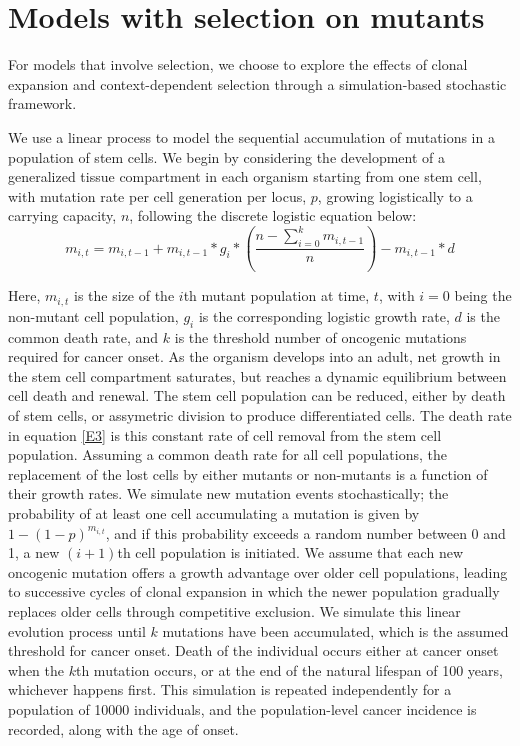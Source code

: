 \documentclass[10pt,twocolumn,twoside]{article}
\begin{document}
\section{Models with selection on mutants}
For models that involve selection, we choose to explore the effects of clonal expansion and context-dependent selection through a simulation-based stochastic framework. 

We use a linear process to model the sequential accumulation of mutations in a population of stem cells. We begin by considering the development of a generalized tissue compartment in each organism starting from one stem cell, with mutation rate per cell generation per locus, $p$, growing logistically to a carrying capacity, $n$, following the discrete logistic equation below:
\begin{equation}
	m_{i, t} = m_{i, t-1} + m_{i, t-1}*g_{i}*(\dfrac{n-\sum_{i=0}^{k} m_{i, t-1}}{n}) - m_{i, t-1}*d
	\label{E3}	
\end{equation}

Here, $m_{i, t}$ is the size of the $i$th mutant population at time, $t$, with $i=0$ being the non-mutant cell population, $g_{i}$ is the corresponding logistic growth rate, $d$ is the common death rate, and $k$ is the threshold number of oncogenic mutations required for cancer onset. As the organism develops into an adult, net growth in the stem cell compartment saturates, but reaches a dynamic equilibrium between cell death and renewal. The stem cell population can be reduced, either by death of stem cells, or assymetric division to produce differentiated cells. The death rate in equation \ref{E3} is this constant rate of cell removal from the stem cell population. Assuming a common death rate for all cell populations, the replacement of the lost cells by either mutants or non-mutants is a function of their growth rates. We simulate new mutation events stochastically; the probability of at least one cell accumulating a mutation is given by $1-(1-p)^{m_{i, t}}$, and if this probability exceeds a random number between 0 and 1, a new $(i+1)$th cell population is initiated. We assume that each new oncogenic mutation offers a growth advantage over older cell populations, leading to successive cycles of clonal expansion in which the newer population gradually replaces older cells through competitive exclusion. We simulate this linear evolution process until $k$ mutations have been accumulated, which is the assumed threshold for cancer onset. Death of the individual occurs either at cancer onset when the $k$th mutation occurs, or at the end of the natural lifespan of 100 years, whichever happens first. This simulation is repeated independently for a population of 10000 individuals, and the population-level cancer incidence is recorded, along with the age of onset.
\end{document}
